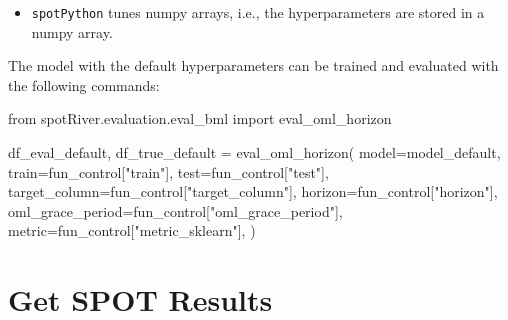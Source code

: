 \documentclass[
  letterpaper,
  DIV=11,
  numbers=noendperiod]{scrreprt}
\newenvironment{Shaded}{\begin{snugshade}}{\end{snugshade}}
\newcommand{\ImportTok}[1]{\textcolor[rgb]{0.00,0.46,0.62}{#1}}
\newcommand{\NormalTok}[1]{\textcolor[rgb]{0.00,0.23,0.31}{#1}}
\newcommand{\OperatorTok}[1]{\textcolor[rgb]{0.37,0.37,0.37}{#1}}
\newcommand{\StringTok}[1]{\textcolor[rgb]{0.13,0.47,0.30}{#1}}
\providecommand{\tightlist}{%
  \setlength{\itemsep}{0pt}\setlength{\parskip}{0pt}}\usepackage{longtable,booktabs,array}
\begin{document}
\begin{tcolorbox}[enhanced jigsaw, rightrule=.15mm, opacityback=0, colframe=quarto-callout-note-color-frame, opacitybacktitle=0.6, toptitle=1mm, arc=.35mm, colbacktitle=quarto-callout-note-color!10!white, coltitle=black, toprule=.15mm, leftrule=.75mm, titlerule=0mm, title=\textcolor{quarto-callout-note-color}{\faInfo}\hspace{0.5em}{Note: \texttt{spotPython} tunes numpy arrays}, bottomrule=.15mm, breakable, bottomtitle=1mm, left=2mm, colback=white]

\begin{itemize}
\tightlist
\item
  \texttt{spotPython} tunes numpy arrays, i.e., the hyperparameters are
  stored in a numpy array.
\end{itemize}

\end{tcolorbox}

The model with the default hyperparameters can be trained and evaluated
with the following commands:

\begin{Shaded}
\begin{Highlighting}[]
\ImportTok{from}\NormalTok{ spotRiver.evaluation.eval\_bml }\ImportTok{import}\NormalTok{ eval\_oml\_horizon}

\NormalTok{df\_eval\_default, df\_true\_default }\OperatorTok{=}\NormalTok{ eval\_oml\_horizon(}
\NormalTok{                    model}\OperatorTok{=}\NormalTok{model\_default,}
\NormalTok{                    train}\OperatorTok{=}\NormalTok{fun\_control[}\StringTok{"train"}\NormalTok{],}
\NormalTok{                    test}\OperatorTok{=}\NormalTok{fun\_control[}\StringTok{"test"}\NormalTok{],}
\NormalTok{                    target\_column}\OperatorTok{=}\NormalTok{fun\_control[}\StringTok{"target\_column"}\NormalTok{],}
\NormalTok{                    horizon}\OperatorTok{=}\NormalTok{fun\_control[}\StringTok{"horizon"}\NormalTok{],}
\NormalTok{                    oml\_grace\_period}\OperatorTok{=}\NormalTok{fun\_control[}\StringTok{"oml\_grace\_period"}\NormalTok{],}
\NormalTok{                    metric}\OperatorTok{=}\NormalTok{fun\_control[}\StringTok{"metric\_sklearn"}\NormalTok{],}
\NormalTok{                )}
\end{Highlighting}
\end{Shaded}

\hypertarget{get-spot-results-7}{%
\section{Get SPOT Results}\label{get-spot-results-7}}
\end{document}
